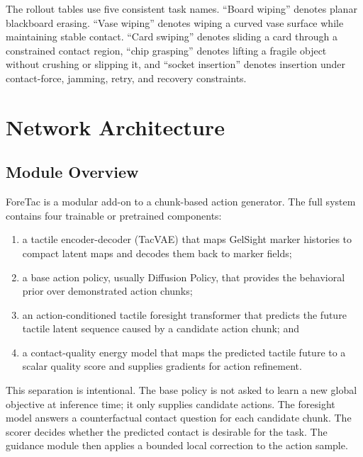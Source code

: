 \documentclass[10pt,letterpaper]{article}
\newcommand{\method}{ForeTac}
\begin{document}
The rollout tables use five consistent task names. ``Board wiping'' denotes
planar blackboard erasing. ``Vase wiping'' denotes wiping a curved vase surface
while maintaining stable contact. ``Card swiping'' denotes sliding a card
through a constrained contact region, ``chip grasping'' denotes lifting a
fragile object without crushing or slipping it, and ``socket insertion''
denotes insertion under contact-force, jamming, retry, and recovery constraints.

\section{Network Architecture}
\label{sec:architecture}

\subsection{Module Overview}

\method{} is a modular add-on to a chunk-based action generator. The full
system contains four trainable or pretrained components:
\begin{enumerate}
\item a tactile encoder-decoder (TacVAE) that maps GelSight marker histories to
compact latent maps and decodes them back to marker fields;
\item a base action policy, usually Diffusion Policy, that provides the
behavioral prior over demonstrated action chunks;
\item an action-conditioned tactile foresight transformer that predicts the
future tactile latent sequence caused by a candidate action chunk; and
\item a contact-quality energy model that maps the predicted tactile future to
a scalar quality score and supplies gradients for action refinement.
\end{enumerate}

This separation is intentional. The base policy is not asked to learn a new
global objective at inference time; it only supplies candidate actions. The
foresight model answers a counterfactual contact question for each candidate
chunk. The scorer decides whether the predicted contact is desirable for the
task. The guidance module then applies a bounded local correction to the action
sample.
\end{document}
